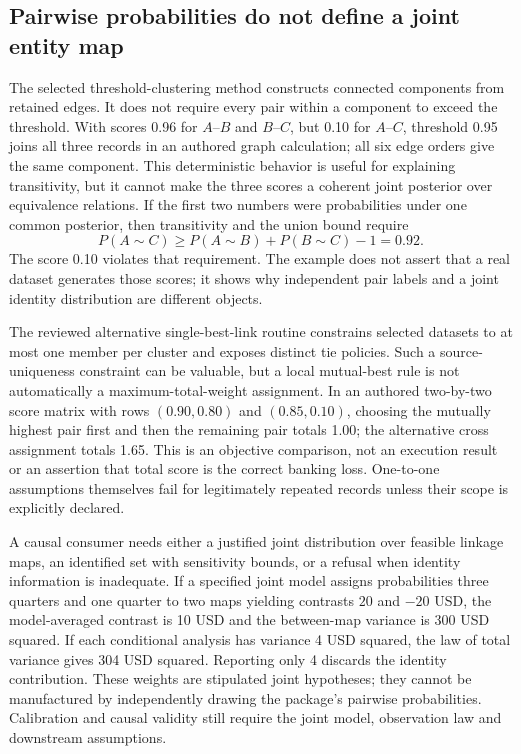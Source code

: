 \subsection{Pairwise probabilities do not define a joint entity map}
The selected threshold-clustering method constructs connected components from retained edges. It does not require every pair within a component to exceed the threshold. With scores 0.96 for $A$--$B$ and $B$--$C$, but 0.10 for $A$--$C$, threshold 0.95 joins all three records in an authored graph calculation; all six edge orders give the same component. This deterministic behavior is useful for explaining transitivity, but it cannot make the three scores a coherent joint posterior over equivalence relations. If the first two numbers were probabilities under one common posterior, then transitivity and the union bound require
\[P(A\sim C)\geq P(A\sim B)+P(B\sim C)-1=0.92.\]
The score 0.10 violates that requirement. The example does not assert that a real dataset generates those scores; it shows why independent pair labels and a joint identity distribution are different objects.~\citep{exec24_splink_sources,exec24_splink_contract}

The reviewed alternative single-best-link routine constrains selected datasets to at most one member per cluster and exposes distinct tie policies. Such a source-uniqueness constraint can be valuable, but a local mutual-best rule is not automatically a maximum-total-weight assignment. In an authored two-by-two score matrix with rows $(0.90,0.80)$ and $(0.85,0.10)$, choosing the mutually highest pair first and then the remaining pair totals 1.00; the alternative cross assignment totals 1.65. This is an objective comparison, not an execution result or an assertion that total score is the correct banking loss. One-to-one assumptions themselves fail for legitimately repeated records unless their scope is explicitly declared.~\citep{exec24_splink_sources,exec24_splink_contract}

A causal consumer needs either a justified joint distribution over feasible linkage maps, an identified set with sensitivity bounds, or a refusal when identity information is inadequate. If a specified joint model assigns probabilities three quarters and one quarter to two maps yielding contrasts $20$ and $-20$ USD, the model-averaged contrast is 10 USD and the between-map variance is 300 USD squared. If each conditional analysis has variance 4 USD squared, the law of total variance gives 304 USD squared. Reporting only 4 discards the identity contribution. These weights are stipulated joint hypotheses; they cannot be manufactured by independently drawing the package's pairwise probabilities. Calibration and causal validity still require the joint model, observation law and downstream assumptions.~\citep{exec24_splink_contract}

